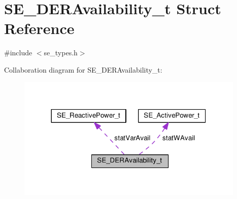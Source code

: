 \hypertarget{structSE__DERAvailability__t}{}\section{S\+E\+\_\+\+D\+E\+R\+Availability\+\_\+t Struct Reference}
\label{structSE__DERAvailability__t}


{\ttfamily \#include $<$se\+\_\+types.\+h$>$}



Collaboration diagram for S\+E\+\_\+\+D\+E\+R\+Availability\+\_\+t\+:\nopagebreak
\begin{figure}[H]
\begin{center}
\leavevmode
\includegraphics[width=308pt]{structSE__DERAvailability__t__coll__graph}
\end{center}
\end{figure}
